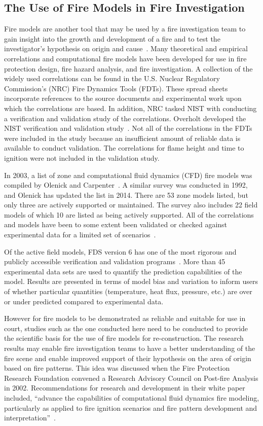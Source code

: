 \documentclass[twoside]{uocthesis}
\begin{document}
\subsection{The Use of Fire Models in Fire Investigation}
Fire models are another tool that may be used by a fire investigation team to gain insight into the growth and development of a fire and to test the investigator’s hypothesis on origin and cause~\cite{Sutula:2001}.  Many theoretical and empirical correlations and computational fire models have been developed for use in fire protection design, fire hazard analysis, and fire investigation.  A collection of the widely used correlations can be found in the U.S. Nuclear Regulatory Commission’s (NRC) Fire Dynamics Tools (FDTs). These spread sheets incorporate references to the source documents and experimental work upon which the correlations are based. In addition, NRC tasked NIST with conducting a verification and validation study of the correlations. Overholt developed the NIST verification and validation study~\cite{Overholt:2014}. Not all of the correlations in the FDTs were included in the study because an insufficient amount of reliable data is available to conduct validation.  The correlations for flame height and time to ignition were not included in the validation study.

In 2003, a list of zone and computational fluid dynamics (CFD) fire models was compiled by Olenick and Carpenter~\cite{Olenick:2003}. A similar survey was conducted in 1992, and Olenick has updated the list in 2014. There are 53 zone models listed, but only three are actively supported or maintained.  The survey also includes 22 field models of which 10 are listed as being actively supported.  All of the correlations and models have been to some extent been validated or checked against experimental data for a limited set of scenarios~\cite{ASTM_E1355}.

Of the active field models, FDS version 6 has one of the most rigorous and publicly accessible verification and validation programs~\cite{McGrattan:2014}. More than 45 experimental data sets are used to quantify the prediction capabilities of the model.  Results are presented in terms of model bias and variation to inform users of whether particular quantities (temperature, heat flux, pressure, etc.) are over or under predicted compared to experimental data.

However for fire models to be demonstrated as reliable and suitable for use in court, studies such as the one conducted here need to be conducted to provide the scientific basis for the use of fire models for re-construction.  The research results may enable fire investigation teams to have a better understanding of the fire scene and enable improved support of their hypothesis on the area of origin based on fire patterns.  This idea was discussed when the Fire Protection Research Foundation convened a Research Advisory Council on Post-fire Analysis in 2002.  Recommendations for research and development in their white paper included, ``advance the capabilities of computational fluid dynamics fire modeling, particularly as applied to fire ignition scenarios and fire pattern development and interpretation''~\cite{RAC:2002}.
\end{document}
